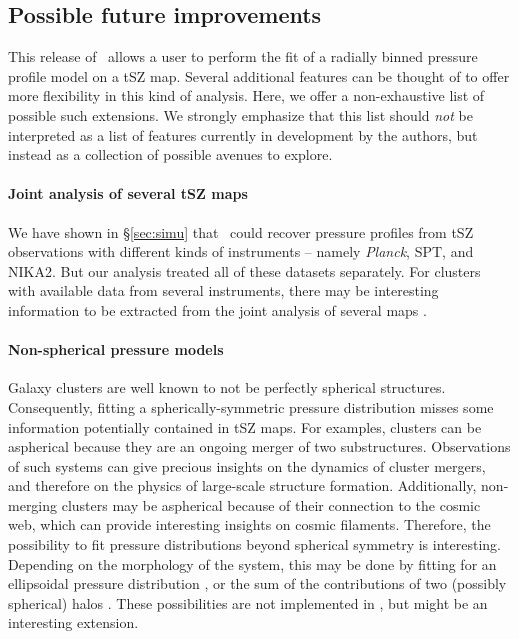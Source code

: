 \subsection{Possible future improvements}

This release of \panco\ allows a user to perform the fit of a radially binned pressure profile model on a tSZ map.
Several additional features can be thought of to offer more flexibility in this kind of analysis.
Here, we offer a non-exhaustive list of possible such extensions.
We strongly emphasize that this list should \textit{not} be interpreted as a list of features currently in development by the authors, but instead as a collection of possible avenues to explore.

\paragraph{Joint analysis of several tSZ maps} %
We have shown in \S\ref{sec:simu} that \panco\ could recover pressure profiles from tSZ observations with different kinds of instruments -- namely \textit{Planck}, SPT, and NIKA2.
But our analysis treated all of these datasets separately.
For clusters with available data from several instruments, there may be interesting information to be extracted from the joint analysis of several maps \citep[see \eg][]{ruppin_first_2018, romero_multi-instrument_2018}.

\paragraph{Non-spherical pressure models} %
Galaxy clusters are well known to not be perfectly spherical structures.
Consequently, fitting a spherically-symmetric pressure distribution misses some information potentially contained in tSZ maps.
For examples, clusters can be aspherical because they are an ongoing merger of two substructures.
Observations of such systems can give precious insights on the dynamics of cluster mergers, and therefore on the physics of large-scale structure formation.
Additionally, non-merging clusters may be aspherical because of their connection to the cosmic web, which can provide interesting insights on cosmic filaments.
Therefore, the possibility to fit pressure distributions beyond spherical symmetry is interesting.
Depending on the morphology of the system, this may be done by fitting for an ellipsoidal pressure distribution \addcite, or the sum of the contributions of two (possibly spherical) halos \citep[\eg][]{artis_psz2_2022}.
These possibilities are not implemented in \panco, but might be an interesting extension.

